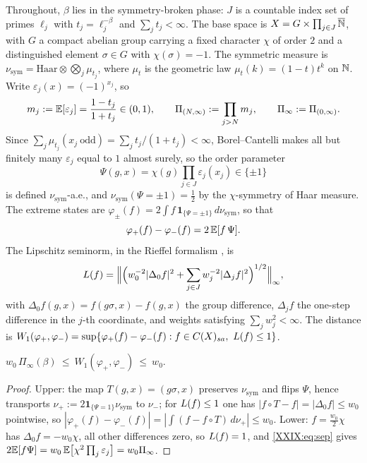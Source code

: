 Throughout, $\beta$ lies in the symmetry-broken phase: $J$ is a countable index set of
primes $\ell_j$ with $t_j=\ell_j^{-\beta}$ and $\sum_jt_j<\infty$. The base space is
$X=G\times\prod_{j\in J}\overline{\mathbb{N}}$, with $G$ a compact abelian group carrying a fixed
character $\chi$ of order $2$ and a distinguished element $\sigma\in G$ with
$\chi(\sigma)=-1$. The symmetric measure is
$\nu_{\mathrm{sym}}=\mathrm{Haar}\otimes\bigotimes_j\mu_{t_j}$, where $\mu_t$ is the
geometric law $\mu_t(k)=(1-t)t^k$ on $\mathbb{N}$. Write $\varepsilon_j(x)=(-1)^{x_j}$, so
\[
m_j:=\mathbb{E}[\varepsilon_j]=\frac{1-t_j}{1+t_j}\in(0,1),
\qquad
\Pi_{(N,\infty)}:=\prod_{j>N}m_j,\qquad \Pi_\infty:=\Pi_{(0,\infty)} .
\]
Since $\sum_j\mu_{t_j}(x_j\ \mathrm{odd})=\sum_jt_j/(1+t_j)<\infty$, Borel--Cantelli makes
all but finitely many $\varepsilon_j$ equal to $1$ almost surely, so the order parameter
\[
\Psi(g,x)=\chi(g)\prod_{j\in J}\varepsilon_j(x_j)\in\{\pm1\}
\]
is defined $\nu_{\mathrm{sym}}$-a.e., and $\nu_{\mathrm{sym}}(\Psi=\pm1)=\tfrac12$ by the
$\chi$-symmetry of Haar measure. The extreme states are
$\varphi_\pm(f)=2\int f\,\mathbf1_{\{\Psi=\pm1\}}\,d\nu_{\mathrm{sym}}$, so that
\begin{equation}\label{XXIX:eq:sep}
\varphi_+(f)-\varphi_-(f)=2\,\mathbb{E}[f\,\Psi].
\end{equation}
The Lipschitz seminorm, in the Rieffel formalism \cite{Rieffel}, is
\[
L(f)=\Bigl\|\Bigl(w_0^{-2}|\Delta_0f|^2+\sum_{j\in J}w_j^{-2}|\Delta_jf|^2\Bigr)^{1/2}\Bigr\|_\infty,
\]
with $\Delta_0f(g,x)=f(g\sigma,x)-f(g,x)$ the group difference,
$\Delta_jf$ the one-step difference in the $j$-th coordinate, and weights satisfying
$\sum_jw_j^2<\infty$. The distance is
$W_1(\varphi_+,\varphi_-)=\sup\{\varphi_+(f)-\varphi_-(f):f\in C(X)_{sa},\ L(f)\le1\}$.

\begin{lemma}\label{XXIX:lem:squeeze}
$w_0\,\Pi_\infty(\beta)\ \le\ W_1(\varphi_+,\varphi_-)\ \le\ w_0$.
\end{lemma}

\begin{proof}
Upper: the map $T(g,x)=(g\sigma,x)$ preserves $\nu_{\mathrm{sym}}$ and flips $\Psi$, hence
transports $\nu_+:=2\mathbf1_{\{\Psi=1\}}\nu_{\mathrm{sym}}$ to $\nu_-$; for $L(f)\le1$
one has $|f\circ T-f|=|\Delta_0f|\le w_0$ pointwise, so
$|\varphi_+(f)-\varphi_-(f)|=|\int(f-f\circ T)\,d\nu_+|\le w_0$. Lower: $f=\frac{w_0}{2}\chi$
has $\Delta_0f=-w_0\chi$, all other differences zero, so $L(f)=1$, and \eqref{XXIX:eq:sep}
gives $2\mathbb{E}[f\Psi]=w_0\,\mathbb{E}\bigl[\chi^2\textstyle\prod_j\varepsilon_j\bigr]=w_0\Pi_\infty$.
\end{proof}

